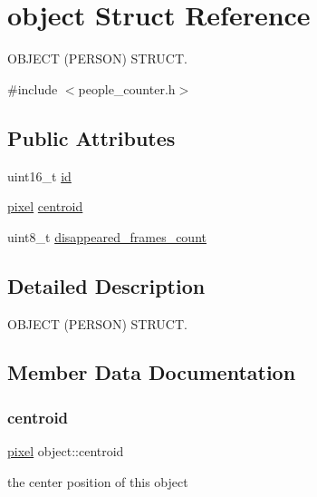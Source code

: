 \hypertarget{structobject}{}\section{object Struct Reference}
\label{structobject}


O\+B\+J\+E\+CT (P\+E\+R\+S\+ON) S\+T\+R\+U\+CT.  




{\ttfamily \#include $<$people\+\_\+counter.\+h$>$}

\subsection*{Public Attributes}
\begin{DoxyCompactItemize}
\item 
uint16\+\_\+t \mbox{\hyperlink{structobject_a58d1f0fec45caa726d12138380cfca64}{id}}
\item 
\mbox{\hyperlink{structpixel}{pixel}} \mbox{\hyperlink{structobject_ab5b26b58f636060be38e5149705d4597}{centroid}}
\item 
uint8\+\_\+t \mbox{\hyperlink{structobject_a8a576c195d30e82aac980385cc0335c1}{disappeared\+\_\+frames\+\_\+count}}
\end{DoxyCompactItemize}


\subsection{Detailed Description}
O\+B\+J\+E\+CT (P\+E\+R\+S\+ON) S\+T\+R\+U\+CT. 



\subsection{Member Data Documentation}
\mbox{\label{structobject_ab5b26b58f636060be38e5149705d4597}} 
\subsubsection{\texorpdfstring{centroid}{centroid}}
{\footnotesize\ttfamily \mbox{\hyperlink{structpixel}{pixel}} object\+::centroid}

the center position of this object \mbox{\label{structobject_a8a576c195d30e82aac980385cc0335c1}} 
